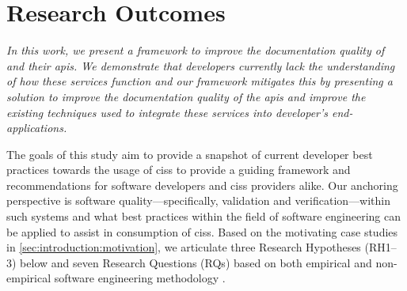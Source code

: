 \section{Research Outcomes}
\label{sec:introduction:hypohtesis}

\itshape
In this work, we present a framework to improve the documentation quality of  and their \glspl{api}. We demonstrate that developers currently lack the understanding of how these services function and our framework mitigates this by presenting a solution to improve the documentation quality of the \glspl{api} and improve the existing techniques used to integrate these services into developer's end-applications.

\upshape

The goals of this study aim to provide a snapshot of current developer best practices towards the usage of \glspl{cis} to provide a guiding framework and recommendations for software developers and \glspl{cis} providers alike. Our anchoring perspective is software quality---specifically, validation and verification---within such systems and what best practices within the field of software engineering can be applied to assist in consumption of \glspl{cis}.
 Based on the motivating case studies in \cref{sec:introduction:motivation}, we articulate three Research Hypotheses (RH1--3) below and seven Research Questions (RQs) based on  both empirical and non-empirical software engineering methodology \citep{Shull:2007vh,Simon:1996uw}.

